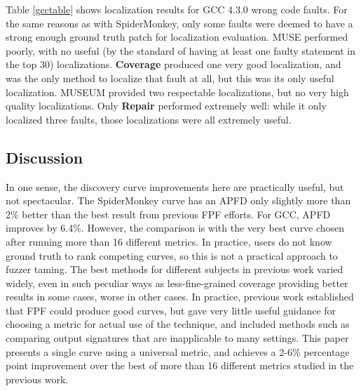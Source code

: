 Table \ref{gcctable} shows localization results for GCC 4.3.0 wrong code faults.  For the same reasons as with SpiderMonkey, only some faults were deemed to have a strong enough ground truth patch for localization evaluation.   MUSE performed poorly, with no useful (by the standard of having at least one faulty statement in the top 30) localizations.  {\bf Coverage} produced one very good localization, and was the only method to localize that fault at all, but this was its only useful localization.  MUSEUM provided two respectable localizations, but no very high quality localizations.  Only {\bf Repair} performed extremely well:  while it only localized three faults, those localizations were all extremely useful.

\subsection{Discussion}

In one sense, the discovery curve improvements here are practically useful, but not spectacular.  The SpiderMonkey curve has an APFD only slightly more than 2\% better than the best result from previous FPF efforts.  For GCC, APFD improves by 6.4\%.  However, the comparison is with the very best curve chosen after running more than 16 different metrics.  In practice, users do not know ground truth to rank competing curves, so this is not a practical approach to fuzzer taming.  The best methods for different subjects in previous work varied widely, even in such peculiar ways as less-fine-grained coverage providing better results in some cases, worse in other cases.   In practice, previous work established that FPF could produce good curves, but gave very little useful guidance for choosing a metric for actual use of the technique, and included methods such as comparing output signatures that are inapplicable to many settings.  This paper presents a single curve using a universal metric, and achieves a 2-6\% percentage point improvement over the best of more than 16 different metrics studied in the previous work.

